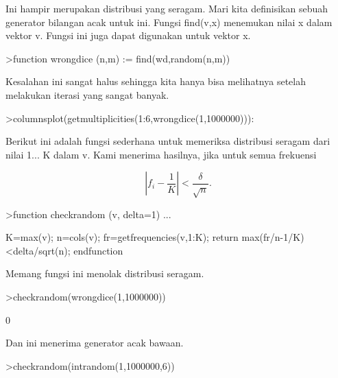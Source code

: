 \documentclass{article}
\begin{document}
\begin{eulernotebook}
\begin{eulercomment}
Ini hampir merupakan distribusi yang seragam. Mari kita definisikan
sebuah generator bilangan acak untuk ini. Fungsi find(v,x) menemukan
nilai x dalam vektor v. Fungsi ini juga dapat digunakan untuk vektor
x.
\end{eulercomment}
\begin{eulerprompt}
>function wrongdice (n,m) := find(wd,random(n,m))
\end{eulerprompt}
\begin{eulercomment}
Kesalahan ini sangat halus sehingga kita hanya bisa melihatnya setelah
melakukan iterasi yang sangat banyak.
\end{eulercomment}
\begin{eulerprompt}
>columnsplot(getmultiplicities(1:6,wrongdice(1,1000000))):
\end{eulerprompt}
\begin{eulercomment}
Berikut ini adalah fungsi sederhana untuk memeriksa distribusi seragam
dari nilai 1... K dalam v. Kami menerima hasilnya, jika untuk semua
frekuensi\\
\end{eulercomment}
\begin{eulerformula}
\[
\left|f_i-\frac{1}{K}\right| < \frac{\delta}{\sqrt{n}}.
\]
\end{eulerformula}
\begin{eulerprompt}
>function checkrandom (v, delta=1) ...
\end{eulerprompt}
\begin{eulerudf}
    K=max(v); n=cols(v);
    fr=getfrequencies(v,1:K);
    return max(fr/n-1/K)<delta/sqrt(n);
    endfunction
\end{eulerudf}
\begin{eulercomment}
Memang fungsi ini menolak distribusi seragam.
\end{eulercomment}
\begin{eulerprompt}
>checkrandom(wrongdice(1,1000000))
\end{eulerprompt}
\begin{euleroutput}
  0
\end{euleroutput}
\begin{eulercomment}
Dan ini menerima generator acak bawaan.
\end{eulercomment}
\begin{eulerprompt}
>checkrandom(intrandom(1,1000000,6))
\end{eulerprompt}
\begin{euleroutput}

\end{euleroutput}
\end{eulernotebook}
\end{document}
